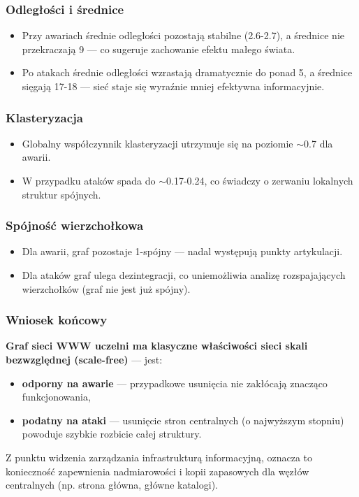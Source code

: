 \subsubsection{Odległości i średnice}

\begin{itemize}
    \item Przy awariach średnie odległości pozostają stabilne (2.6-2.7), a średnice nie przekraczają 9 — co sugeruje zachowanie efektu małego świata.
    \item Po atakach średnie odległości wzrastają dramatycznie do ponad 5, a średnice sięgają 17-18 — sieć staje się wyraźnie mniej efektywna informacyjnie.
\end{itemize}

\subsubsection{Klasteryzacja}

\begin{itemize}
    \item Globalny współczynnik klasteryzacji utrzymuje się na poziomie $\sim$0.7 dla awarii.
    \item W przypadku ataków spada do $\sim$0.17-0.24, co świadczy o zerwaniu lokalnych struktur spójnych.
\end{itemize}

\subsubsection{Spójność wierzchołkowa}

\begin{itemize}
    \item Dla awarii, graf pozostaje 1-spójny — nadal występują punkty artykulacji.
    \item Dla ataków graf ulega dezintegracji, co uniemożliwia analizę rozspajających wierzchołków (graf nie jest już spójny).
\end{itemize}

\subsubsection{Wniosek końcowy}

\textbf{Graf sieci WWW uczelni ma klasyczne właściwości sieci skali bezwzględnej (scale-free)} — jest:
\begin{itemize}
    \item \textbf{odporny na awarie} — przypadkowe usunięcia nie zakłócają znacząco funkcjonowania,
    \item \textbf{podatny na ataki} — usunięcie stron centralnych (o najwyższym stopniu) powoduje szybkie rozbicie całej struktury.
\end{itemize}

Z punktu widzenia zarządzania infrastrukturą informacyjną, oznacza to konieczność zapewnienia nadmiarowości i kopii zapasowych dla węzłów centralnych (np. strona główna, główne katalogi).
